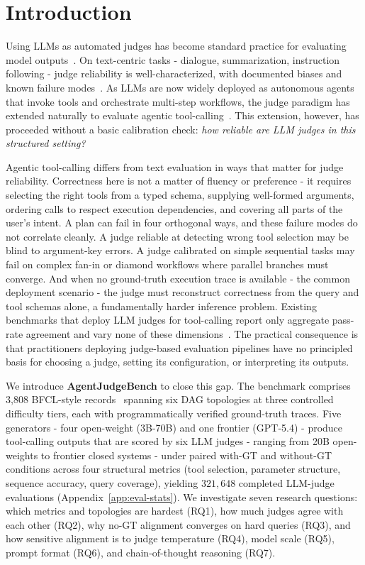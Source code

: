 \section{Introduction}

Using LLMs as automated judges has become standard practice for evaluating model outputs~\cite{zheng2023judging,tan2024judgebench,li2024arenahard}. On text-centric tasks - dialogue, summarization, instruction following - judge reliability is well-characterized, with documented biases and known failure modes~\cite{zheng2023judging,wang2024fair}. As LLMs are now widely deployed as autonomous agents that invoke tools and orchestrate multi-step workflows, the judge paradigm has extended naturally to evaluate agentic tool-calling~\cite{qin2023toolllm,guo2024stabletoolbench,mcpagentbench2025}. This extension, however, has proceeded without a basic calibration check: \emph{how reliable are LLM judges in this structured setting?}

Agentic tool-calling differs from text evaluation in ways that matter for judge reliability. Correctness here is not a matter of fluency or preference - it requires selecting the right tools from a typed schema, supplying well-formed arguments, ordering calls to respect execution dependencies, and covering all parts of the user's intent. A plan can fail in four orthogonal ways, and these failure modes do not correlate cleanly. A judge reliable at detecting wrong tool selection may be blind to argument-key errors. A judge calibrated on simple sequential tasks may fail on complex fan-in or diamond workflows where parallel branches must converge. And when no ground-truth execution trace is available - the common deployment scenario - the judge must reconstruct correctness from the query and tool schemas alone, a fundamentally harder inference problem. Existing benchmarks that deploy LLM judges for tool-calling report only aggregate pass-rate agreement and vary none of these dimensions~\cite{qin2023toolllm,guo2024stabletoolbench,mcpagentbench2025}. The practical consequence is that practitioners deploying judge-based evaluation pipelines have no principled basis for choosing a judge, setting its configuration, or interpreting its outputs.

We introduce \textbf{AgentJudgeBench} to close this gap. The benchmark comprises 3,808 BFCL-style records~\cite{patil2025bfcl} spanning six DAG topologies at three controlled difficulty tiers, each with programmatically verified ground-truth traces. Five generators - four open-weight (3B-70B) and one frontier (GPT-5.4) - produce tool-calling outputs that are scored by six LLM judges - ranging from 20B open-weights to frontier closed systems - under paired with-GT and without-GT conditions across four structural metrics (tool selection, parameter structure, sequence accuracy, query coverage), yielding $321{,}648$ completed LLM-judge evaluations (Appendix~\ref{app:eval-stats}). We investigate seven research questions: which metrics and topologies are hardest (RQ1), how much judges agree with each other (RQ2), why no-GT alignment converges on hard queries (RQ3), and how sensitive alignment is to judge temperature (RQ4), model scale (RQ5), prompt format (RQ6), and chain-of-thought reasoning (RQ7).


